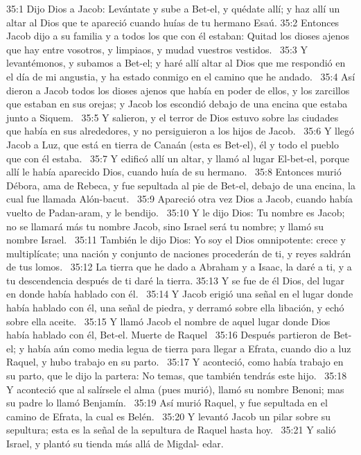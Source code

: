 35:1 Dijo Dios a Jacob: Levántate y sube a Bet-el, y quédate allí; y haz allí un altar al Dios que te apareció cuando huías de tu hermano Esaú. 
35:2 Entonces Jacob dijo a su familia y a todos los que con él estaban: Quitad los dioses ajenos que hay entre vosotros, y limpiaos, y mudad vuestros vestidos.  
35:3 Y levantémonos, y subamos a Bet-el; y haré allí altar al Dios que me respondió en el día de mi angustia, y ha estado conmigo en el camino que he andado.  
35:4 Así dieron a Jacob todos los dioses ajenos que había en poder de ellos, y los zarcillos que estaban en sus orejas; y Jacob los escondió debajo de una encina que estaba junto a Siquem.  
35:5 Y salieron, y el terror de Dios estuvo sobre las ciudades que había en sus alrededores, y no persiguieron a los hijos de Jacob.  
35:6 Y llegó Jacob a Luz, que está en tierra de Canaán (esta es Bet-el), él y todo el pueblo que con él estaba.  
35:7 Y edificó allí un altar, y llamó al lugar El-bet-el, porque allí le había aparecido Dios, cuando huía de su hermano.  
35:8 Entonces murió Débora, ama de Rebeca, y fue sepultada al pie de Bet-el, debajo de una encina, la cual fue llamada Alón-bacut.  
35:9 Apareció otra vez Dios a Jacob, cuando había vuelto de Padan-aram, y le bendijo.  
35:10 Y le dijo Dios: Tu nombre es Jacob; no se llamará más tu nombre Jacob, sino Israel será tu nombre; y llamó su nombre Israel.  
35:11 También le dijo Dios: Yo soy el Dios omnipotente: crece y multiplícate; una nación y conjunto de naciones procederán de ti, y reyes saldrán de tus lomos.  
35:12 La tierra que he dado a Abraham y a Isaac, la daré a ti, y a tu descendencia después de ti daré la tierra. 
35:13 Y se fue de él Dios, del lugar en donde había hablado con él.  
35:14 Y Jacob erigió una señal en el lugar donde había hablado con él, una señal de piedra, y derramó sobre ella libación, y echó sobre ella aceite.  
35:15 Y llamó Jacob el nombre de aquel lugar donde Dios había hablado con él, Bet-el. 
Muerte de Raquel  
35:16 Después partieron de Bet-el; y había aún como media legua de tierra para llegar a Efrata, cuando dio a luz Raquel, y hubo trabajo en su parto.  
35:17 Y aconteció, como había trabajo en su parto, que le dijo la partera: No temas, que también tendrás este hijo.  
35:18 Y aconteció que al salírsele el alma (pues murió), llamó su nombre Benoni; mas su padre lo llamó Benjamín.  
35:19 Así murió Raquel, y fue sepultada en el camino de Efrata, la cual es Belén.  
35:20 Y levantó Jacob un pilar sobre su sepultura; esta es la señal de la sepultura de Raquel hasta hoy.  
35:21 Y salió Israel, y plantó su tienda más allá de Migdal- edar.  

